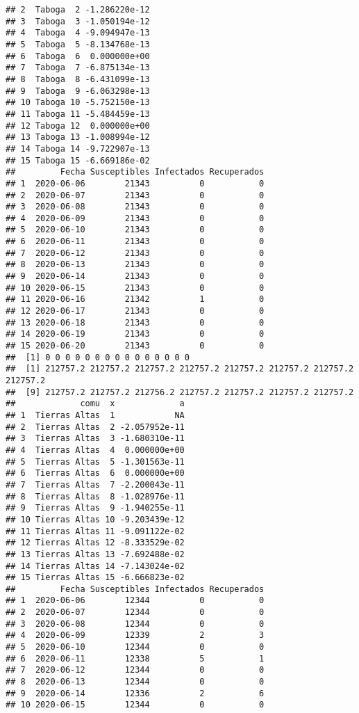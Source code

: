 \documentclass[
]{article}
\begin{document}
\begin{verbatim}
## 2  Taboga  2 -1.286220e-12
## 3  Taboga  3 -1.050194e-12
## 4  Taboga  4 -9.094947e-13
## 5  Taboga  5 -8.134768e-13
## 6  Taboga  6  0.000000e+00
## 7  Taboga  7 -6.875134e-13
## 8  Taboga  8 -6.431099e-13
## 9  Taboga  9 -6.063298e-13
## 10 Taboga 10 -5.752150e-13
## 11 Taboga 11 -5.484459e-13
## 12 Taboga 12  0.000000e+00
## 13 Taboga 13 -1.008994e-12
## 14 Taboga 14 -9.722907e-13
## 15 Taboga 15 -6.669186e-02
##         Fecha Susceptibles Infectados Recuperados
## 1  2020-06-06        21343          0           0
## 2  2020-06-07        21343          0           0
## 3  2020-06-08        21343          0           0
## 4  2020-06-09        21343          0           0
## 5  2020-06-10        21343          0           0
## 6  2020-06-11        21343          0           0
## 7  2020-06-12        21343          0           0
## 8  2020-06-13        21343          0           0
## 9  2020-06-14        21343          0           0
## 10 2020-06-15        21343          0           0
## 11 2020-06-16        21342          1           0
## 12 2020-06-17        21343          0           0
## 13 2020-06-18        21343          0           0
## 14 2020-06-19        21343          0           0
## 15 2020-06-20        21343          0           0
##  [1] 0 0 0 0 0 0 0 0 0 0 0 0 0 0 0
##  [1] 212757.2 212757.2 212757.2 212757.2 212757.2 212757.2 212757.2 212757.2
##  [9] 212757.2 212757.2 212756.2 212757.2 212757.2 212757.2 212757.2
##             comu  x             a
## 1  Tierras Altas  1            NA
## 2  Tierras Altas  2 -2.057952e-11
## 3  Tierras Altas  3 -1.680310e-11
## 4  Tierras Altas  4  0.000000e+00
## 5  Tierras Altas  5 -1.301563e-11
## 6  Tierras Altas  6  0.000000e+00
## 7  Tierras Altas  7 -2.200043e-11
## 8  Tierras Altas  8 -1.028976e-11
## 9  Tierras Altas  9 -1.940255e-11
## 10 Tierras Altas 10 -9.203439e-12
## 11 Tierras Altas 11 -9.091122e-02
## 12 Tierras Altas 12 -8.333529e-02
## 13 Tierras Altas 13 -7.692488e-02
## 14 Tierras Altas 14 -7.143024e-02
## 15 Tierras Altas 15 -6.666823e-02
##         Fecha Susceptibles Infectados Recuperados
## 1  2020-06-06        12344          0           0
## 2  2020-06-07        12344          0           0
## 3  2020-06-08        12344          0           0
## 4  2020-06-09        12339          2           3
## 5  2020-06-10        12344          0           0
## 6  2020-06-11        12338          5           1
## 7  2020-06-12        12344          0           0
## 8  2020-06-13        12344          0           0
## 9  2020-06-14        12336          2           6
## 10 2020-06-15        12344          0           0

\end{verbatim}
\end{document}
